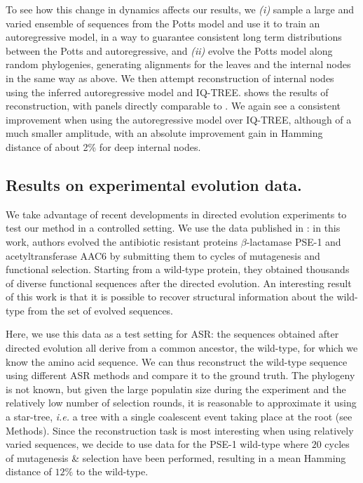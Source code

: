 To see how this change in dynamics affects our results, we \emph{(i)} sample a large and varied ensemble of sequences from the Potts model and use it to train an autoregressive model, in a way to guarantee consistent long term distributions between the Potts and autoregressive, and \emph{(ii)} evolve the Potts model along random phylogenies, generating alignments for the leaves and the internal nodes in the same way as above. 
We then attempt reconstruction of internal nodes using the inferred autoregressive model and IQ-TREE.
 shows the results of reconstruction, with panels directly comparable to . 
We again see a consistent improvement when using the autoregressive model over IQ-TREE, although of a much smaller amplitude, with an absolute improvement gain in Hamming distance of about 2\% for deep internal nodes.


\subsection{Results on experimental evolution data.}

We take advantage of recent developments in directed evolution experiments to test our method in a controlled setting. 
We use the data published in \cite{stiffler_proteinstructureexperimental_2020}: in this work, authors evolved the antibiotic resistant proteins $\beta$-lactamase PSE-1 and acetyltransferase AAC6 by submitting them to  cycles of mutagenesis and functional selection. 
Starting from a wild-type protein, they obtained thousands of diverse functional sequences after the directed evolution. 
An interesting result of this work is that it is possible to recover structural information about the wild-type from the set of evolved sequences. 

Here, we use this data as a test setting for ASR: the sequences obtained after directed evolution all derive from a common ancestor, the wild-type, for which we know the amino acid sequence. 
We can thus reconstruct the wild-type sequence using different ASR methods and compare it to the ground truth. 
The phylogeny is not known, but given the large populatin size during the experiment and the relatively low number of selection rounds, it is reasonable to approximate it using a star-tree, \emph{i.e.} a tree with a single coalescent event taking place at the root (see Methods). 
Since the reconstruction task is most interesting when using relatively varied sequences, we decide to use data for the PSE-1 wild-type where $20$ cycles of mutagenesis \& selection have been performed, resulting in a mean Hamming distance of $12\%$ to the wild-type. 

